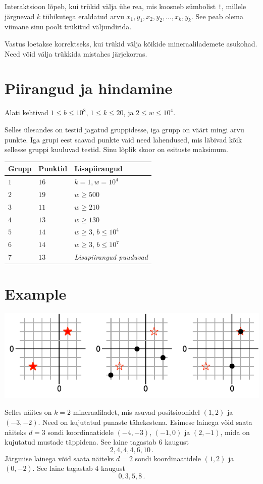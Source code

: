 Interaktsioon lõpeb, kui trükid välja ühe rea, mis koosneb sümbolist \texttt{!}, millele järgnevad $k$ tühikutega eraldatud arvu $x_1, y_1, x_2, y_2, \ldots, x_k, y_k$.
See peab olema viimane sinu poolt trükitud väljundirida.

Vastus loetakse korrektseks, kui trükid välja kõikide mineraalilademete asukohad.
Need võid välja trükkida mistahes järjekorras.

\section*{Piirangud ja hindamine}

Alati kehtivad
$1\leq b \leq 10^8$, %
$1 \leq k \leq 20$, %
ja
$2 \le w \le 10^4$. %

Selles ülesandes on testid jagatud gruppidesse, iga grupp on väärt mingi arvu punkte.
Iga grupi eest saavad punkte vaid need lahendused, mis läbivad kõik sellesse gruppi kuuluvad testid.
Sinu lõplik skoor on esituste maksimum.

\medskip
\begin{tabular}{lll}
Grupp & Punktid & Lisapiirangud \\\hline
  $1$ & $16$ & $k = 1, w = 10^4$\\
  $2$ & $19$ & $w \ge 500$\\
  $3$ & $11$ & $w \ge 210$\\
  $4$ & $13$ & $w \ge 130$\\
  $5$ & $14$ & $w \ge 3$, $b \le 10^4$\\
  $6$ & $14$ & $w \ge 3$, $b \le 10^7$\\
  $7$ & $13$ & \emph{Lisapiirangud puuduvad}
\end{tabular}

\section*{Example}

\includegraphics[width=.6\textwidth]{img/sample1.pdf}

Selles näites on $k=2$ mineraaliladet, mis asuvad positsioonidel $(1,2)$ ja $(-3,-2)$. Need on kujutatud punaste tähekestena.
Esimese lainega võid saata näiteks $d=3$ sondi koordinaatidele $(-4,-3)$, $(-1, 0)$ ja $(2,-1)$, mida on kujutatud mustade täppidena.
See laine tagastab $6$ kaugust \[
  2, 4, 4, 4, 6, 10\,.
\]
Järgmise lainega võid saata näiteks $d=2$ sondi koordinaatidele $(1,2)$ ja $(0,-2)$.
See laine tagastab $4$ kaugust \[
  0, 3, 5, 8\,.
\]
